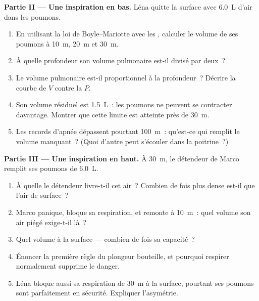 \begin{problem}
\medskip
\noindent\textbf{Partie II --- Une inspiration en bas.}
Léna quitte la surface avec \qty{6.0}{L} d'air dans les poumons.
\begin{enumerate}[resume]
  \item En utilisant la loi de Boyle--Mariotte avec les
        , calculer le volume de ses
        poumons à \qty{10}{m}, \qty{20}{m} et \qty{30}{m}.
  \item À quelle profondeur son volume pulmonaire est-il divisé par
        deux~?
  \item Le volume pulmonaire est-il proportionnel à la profondeur~?
        Décrire la courbe de $V$ contre la
         $P$.
  \item Son volume résiduel est \qty{1.5}{L}~: les poumons ne peuvent
        se contracter davantage. Montrer que cette limite est atteinte
        près de \qty{30}{m}.
  \item Les records d'apnée dépassent pourtant \qty{100}{m}~: qu'est-ce
        qui remplit le volume manquant~? (Quoi d'autre peut s'écouler
        dans la poitrine~?)
\end{enumerate}

\medskip
\noindent\textbf{Partie III --- Une inspiration en haut.}
À \qty{30}{m}, le détendeur de Marco remplit ses poumons de
\qty{6.0}{L}.
\begin{enumerate}[resume]
  \item À quelle  le détendeur livre-t-il cet air~?
        Combien de fois plus dense est-il que l'air de surface~?
  \item Marco panique, bloque sa respiration, et remonte à
        \qty{10}{m}~: quel volume son air piégé exige-t-il là~?
  \item Quel volume à la surface --- combien de fois sa capacité~?
  \item Énoncer la première règle du plongeur bouteille, et pourquoi
        respirer normalement supprime le danger.
  \item Léna bloque aussi sa respiration de \qty{30}{m} à la surface,
        pourtant ses poumons sont parfaitement en sécurité. Expliquer
        l'asymétrie.
\end{enumerate}


\end{problem}
